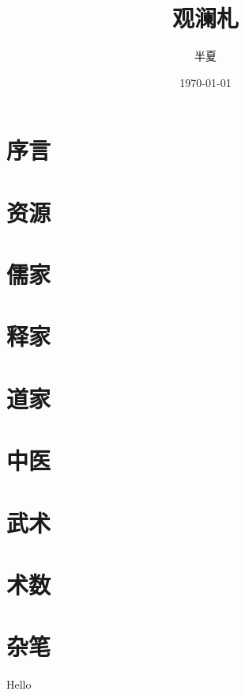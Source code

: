 \documentclass{book}
\begin{document}
\title{观澜札}
\author{半夏}
\date{\today}
\maketitle
\setcounter{tocdepth}{2}
\tableofcontents
\chapter{序言}
\chapter{资源}
\chapter{儒家}
\chapter{释家}
\chapter{道家}
\chapter{中医}
\chapter{武术}
\chapter{术数}
\chapter{杂笔}
Hello
\end{document}
